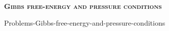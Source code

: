 \documentclass[main.tex]{subfiles}
\newcommand\chapterlabel{Ch-thermo}
\begin{document}
\begin{multicols*}{2}
{\raggedright\textsc{\textbf{Gibbs free-energy and pressure conditions}}\par}{Problems-Gibbs-free-energy-and-pressure-conditions}



\end{multicols*} \iftoggle{showfinalanswers}{
\newpage\fancyhfoffset[E,O]{0pt}
\begin{answerbox}
\begin{answersenvironment}
 \begin{localsize}{10}
{ \checkoddpage\ifoddpage    \else   \clearpage\thispagestyle{empty}\mbox{}\clearpage\fi
\Large \bf Answers}
\SetupExSheets{ headings = inline-nr , counter-format = qu) ,}
\printsolutions 
  \vspace{20cm}
 \end{localsize}
 \end{answersenvironment}
\end{answerbox}
}{}
\checkoddpage\ifoddpage   \clearpage\thispagestyle{empty}\mbox{}\clearpage \else   \fi
\end{document}
